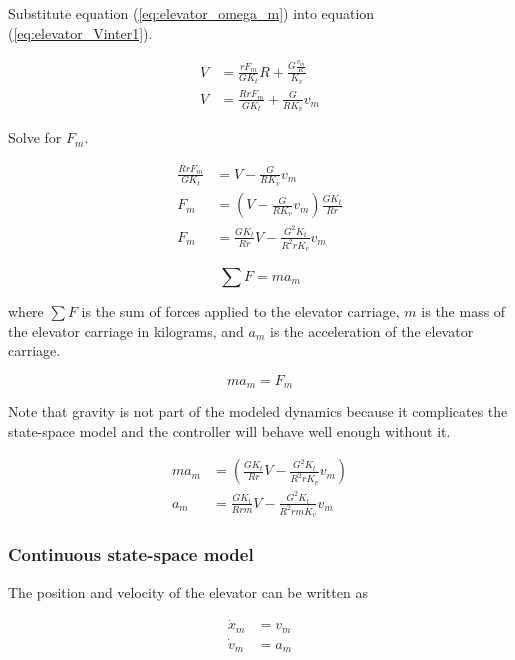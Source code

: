 Substitute equation (\ref{eq:elevator_omega_m}) into equation
(\ref{eq:elevator_Vinter1}).

\begin{align*}
  V &= \frac{rF_m}{GK_t} R + \frac{G \frac{v_m}{R}}{K_v} \\
  V &= \frac{RrF_m}{GK_t} + \frac{G}{RK_v} v_m
\end{align*}

Solve for $F_m$.

\begin{align}
  \frac{RrF_m}{GK_t} &= V - \frac{G}{RK_v} v_m \nonumber \\
  F_m &= \left(V - \frac{G}{RK_v} v_m\right) \frac{GK_t}{Rr} \nonumber \\
  F_m &= \frac{GK_t}{Rr} V - \frac{G^2K_t}{R^2 rK_v} v_m \label{eq:elevator_F_m}
\end{align}

\begin{equation}
  \sum F = ma_m \label{eq:elevator_F_ma}
\end{equation}

where $\sum F$ is the sum of forces applied to the elevator carriage, $m$ is
the mass of the elevator carriage in kilograms, and $a_m$ is the acceleration of
the elevator carriage.

\begin{equation*}
  ma_m = F_m
\end{equation*}

Note that gravity is not part of the modeled dynamics because it complicates the
state-space \gls{model} and the controller will behave well enough without it.

\begin{align}
  ma_m &= \left(\frac{GK_t}{Rr} V - \frac{G^2K_t}{R^2 rK_v} v_m\right)
    \nonumber \\
  a_m &= \frac{GK_t}{Rrm} V - \frac{G^2K_t}{R^2 rmK_v} v_m
    \label{eq:elevator_accel}
\end{align}

\subsubsection{Continuous state-space model}

The position and velocity of the elevator can be written as

\begin{align}
  \dot{x}_m &= v_m \label{eq:elevator_cont_ss_pos} \\
  \dot{v}_m &= a_m \label{eq:elevator_cont_ss_vel}
\end{align}

